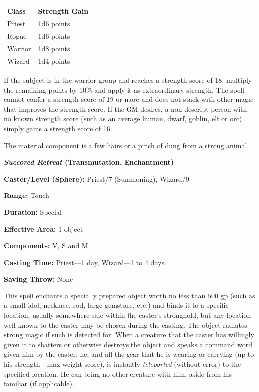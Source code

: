 \begin{multicols}{2}
\noindent
\begin{tabular}{|p{}|p{}|}
\hline
Class	& Strength Gain \\
\hline\hline
\rowcolor[gray]{.9}Priest	& 1d6 points \\
Rogue	& 1d6 points \\
\rowcolor[gray]{.9}Warrior	& 1d8 points \\
Wizard	& 1d4 points \\
\hline
\end{tabular}

If the subject is in the warrior group and reaches a strength score of 18, multiply the remaining points by 10\% and apply it as extraordinary strength.  The spell cannot confer a strength score of 19 or more and does not stack with other magic that improves the strength score.  If the GM desires, a non-descript person with no known strength score (such as an average human, dwarf, goblin, elf or orc) simply gains a strength score of 16.

The material component is a few hairs or a pinch of dung from a strong animal.

\vspace{1em}

\noindent
\begin{minipage}{\columnwidth}

\noindent \textbf{\textit{Succored Retreat} (Transmutation, Enchantment)}

\noindent \textbf{Caster/Level (Sphere):} Priest/7 (Summoning), Wizard/9

\noindent \textbf{Range:} Touch

\noindent \textbf{Duration:} Special

\noindent \textbf{Effective Area:} 1 object

\noindent \textbf{Components:} V, S and M

\noindent \textbf{Casting Time:} Priest---1 day, Wizard---1 to 4 days

\noindent \textbf{Saving Throw:} None

\end{minipage}

This spell enchants a specially prepared object worth no less than 500 gp (such as a small idol, necklace, rod, large gemstone, etc.) and binds it to a specific location, usually somewhere safe within the caster's stronghold, but any location well known to the caster may be chosen during the casting.  The object radiates strong magic if such is detected for.  When a creature that the caster has willingly given it to shatters or otherwise destroys the object and speaks a command word given him by the caster, he, and all the gear that he is wearing or carrying (up to his strength---max weight score), is instantly \textit{teleported} (without error) to the specified location.  He can bring no other creature with him, aside from his familiar (if applicable).


\end{multicols}
